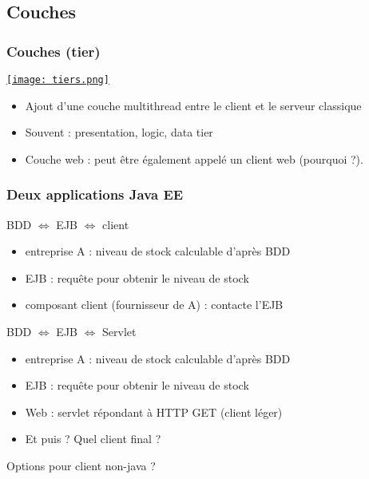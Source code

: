 \documentclass[english, french]{beamer}
\begin{document}
\subsection{Couches}
\begin{frame}
	\frametitle{Couches (\og{}tier\fg{})}
	\begin{minipage}{\columnwidth*\real{0.6}}
		\href{https://docs.oracle.com/javaee/7/tutorial/overview003.htm}{\texttt{[image: tiers.png]}}
	\end{minipage}%
	\begin{minipage}{\columnwidth*\real{0.4}}
		\begin{itemize}
			\item Ajout d’une couche multithread entre le client et le serveur classique
			\item Souvent : presentation, logic, data tier
			\item Couche web : peut être également appelé un client web (pourquoi ?).
		\end{itemize}
	\end{minipage}
\end{frame}

\begin{frame}
	\frametitle{Deux applications Java EE}
	\begin{block}{BDD $⇔$ EJB $⇔$ client}
		\begin{itemize}
			\item entreprise A : niveau de stock calculable d’après BDD
			\item EJB : requête pour obtenir le niveau de stock
			\item composant client (fournisseur de A) : contacte l’EJB
		\end{itemize}		
	\end{block}
	
	\begin{block}{BDD $⇔$ EJB $⇔$ Servlet}
		\begin{itemize}
			\item entreprise A : niveau de stock calculable d’après BDD
			\item EJB : requête pour obtenir le niveau de stock
			\item Web : servlet répondant à HTTP GET (client léger)
			\item Et puis ? Quel client final ?
		\end{itemize}		
	\end{block}
	
	Options pour client non-java ?
\end{frame}
\end{document}
